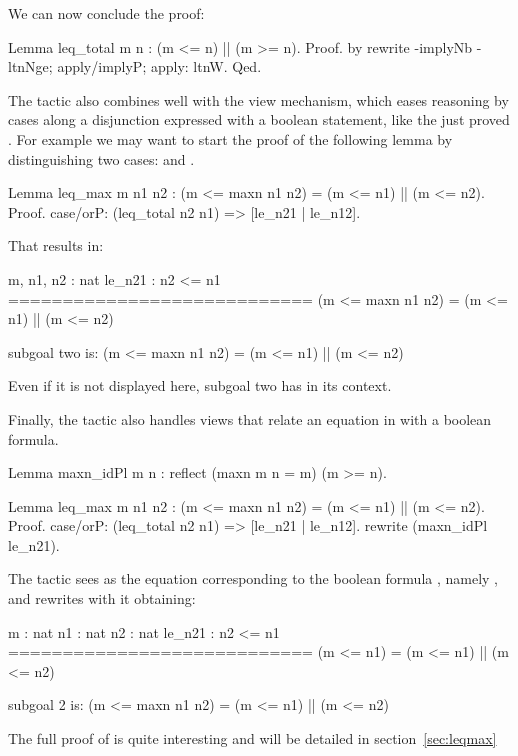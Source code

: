 We can now conclude the proof:

\begin{coq}{}{}
Lemma leq_total m n : (m <= n) || (m >= n).
Proof. by rewrite -implyNb -ltnNge; apply/implyP; apply: ltnW. Qed.
\end{coq}

The  tactic also combines well with the view mechanism, which
eases reasoning by cases along a disjunction expressed with a boolean
statement, like the just proved .  For example we
may want to start the proof of the following lemma by distinguishing
two cases:  and .

\begin{coq}{}{}
Lemma leq_max m n1 n2 :
  (m <= maxn n1 n2) = (m <= n1) || (m <= n2).
Proof.
case/orP: (leq_total n2 n1) => [le_n21 | le_n12].
\end{coq}
That results in:

\begin{coqout}{}{}
m, n1, n2 : nat
le_n21 : n2 <= n1
============================
(m <= maxn n1 n2) = (m <= n1) || (m <= n2)

subgoal two is:
 (m <= maxn n1 n2) = (m <= n1) || (m <= n2)
\end{coqout}
Even if it is not displayed here, subgoal two has 
in its context.

Finally, the  tactic also handles views that relate an
equation in  with a boolean formula.

\begin{coq}{}{}
Lemma maxn_idPl {m n} : reflect (maxn m n = m) (m >= n).

Lemma leq_max m n1 n2 :
  (m <= maxn n1 n2) = (m <= n1) || (m <= n2).
Proof.
case/orP: (leq_total n2 n1) => [le_n21 | le_n12].
  rewrite (maxn_idPl le_n21).
\end{coq}
The tactic sees  as the equation corresponding
to the boolean formula , namely ,
and rewrites with it obtaining:

\begin{coqout}{}{}

  m : nat
  n1 : nat
  n2 : nat
  le_n21 : n2 <= n1
  ============================
   (m <= n1) = (m <= n1) || (m <= n2)

subgoal 2 is:
 (m <= maxn n1 n2) = (m <= n1) || (m <= n2)
\end{coqout}

The full proof of  is quite interesting and will be
detailed in section~\ref{sec:leqmax}

